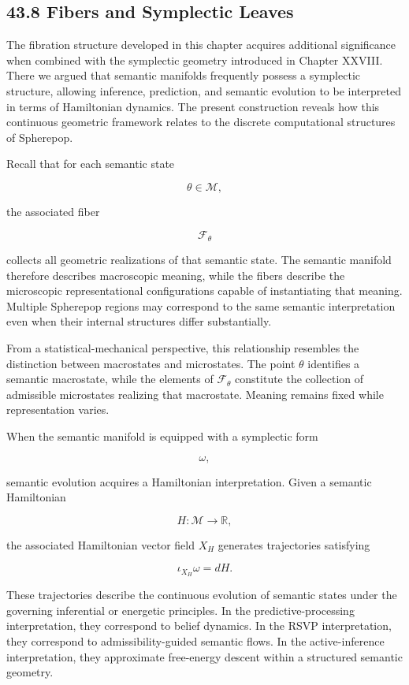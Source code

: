 \documentclass[12pt,letterpaper]{article}
\theoremstyle{remark}
\begin{document}
\subsection{43.8 Fibers and Symplectic Leaves}

The fibration structure developed in this chapter acquires additional significance when combined with the symplectic geometry introduced in Chapter XXVIII. There we argued that semantic manifolds frequently possess a symplectic structure, allowing inference, prediction, and semantic evolution to be interpreted in terms of Hamiltonian dynamics. The present construction reveals how this continuous geometric framework relates to the discrete computational structures of Spherepop.

Recall that for each semantic state

\[
\theta \in \mathcal{M},
\]

the associated fiber

\[
\mathcal{F}_{\theta}
\]

collects all geometric realizations of that semantic state. The semantic manifold therefore describes macroscopic meaning, while the fibers describe the microscopic representational configurations capable of instantiating that meaning. Multiple Spherepop regions may correspond to the same semantic interpretation even when their internal structures differ substantially.

From a statistical-mechanical perspective, this relationship resembles the distinction between macrostates and microstates. The point $\theta$ identifies a semantic macrostate, while the elements of $\mathcal{F}_{\theta}$ constitute the collection of admissible microstates realizing that macrostate. Meaning remains fixed while representation varies.

When the semantic manifold is equipped with a symplectic form

\[
\omega,
\]

semantic evolution acquires a Hamiltonian interpretation. Given a semantic Hamiltonian

\[
H : \mathcal{M} \to \mathbb{R},
\]

the associated Hamiltonian vector field $X_H$ generates trajectories satisfying

\[
\iota_{X_H}\omega = dH.
\]

These trajectories describe the continuous evolution of semantic states under the governing inferential or energetic principles. In the predictive-processing interpretation, they correspond to belief dynamics. In the RSVP interpretation, they correspond to admissibility-guided semantic flows. In the active-inference interpretation, they approximate free-energy descent within a structured semantic geometry.
\end{document}
